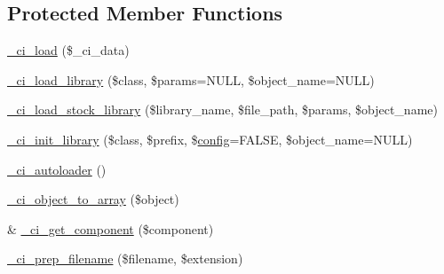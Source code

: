 \subsection*{Protected Member Functions}
\begin{DoxyCompactItemize}
\item 
\hyperlink{class_c_i___loader_ae3b5045c81f69c90afc7e918ff664d37}{\+\_\+ci\+\_\+load} (\$\+\_\+ci\+\_\+data)
\item 
\hyperlink{class_c_i___loader_a5ee20a37e1d55db949084f2f5563d2d2}{\+\_\+ci\+\_\+load\+\_\+library} (\$class, \$params=N\+U\+L\+L, \$object\+\_\+name=N\+U\+L\+L)
\item 
\hyperlink{class_c_i___loader_aa7c2bf48ad1c415720cd219e23f2d6e2}{\+\_\+ci\+\_\+load\+\_\+stock\+\_\+library} (\$library\+\_\+name, \$file\+\_\+path, \$params, \$object\+\_\+name)
\item 
\hyperlink{class_c_i___loader_a20ac1358ec26e9951959f26e2c5ca121}{\+\_\+ci\+\_\+init\+\_\+library} (\$class, \$prefix, \$\hyperlink{class_c_i___loader_af54799dcb5bf2f7346b5d2a7d824a471}{config}=F\+A\+L\+S\+E, \$object\+\_\+name=N\+U\+L\+L)
\item 
\hyperlink{class_c_i___loader_a93471c04ea0689dcf8faa5903d201efe}{\+\_\+ci\+\_\+autoloader} ()
\item 
\hyperlink{class_c_i___loader_ab000c31996cf4b8750f2c1d66aa8413b}{\+\_\+ci\+\_\+object\+\_\+to\+\_\+array} (\$object)
\item 
\& \hyperlink{class_c_i___loader_a189d7f497e55c20fb9f82b065c20e402}{\+\_\+ci\+\_\+get\+\_\+component} (\$component)
\item 
\hyperlink{class_c_i___loader_afbd52d4d271057334cb076106b50a327}{\+\_\+ci\+\_\+prep\+\_\+filename} (\$filename, \$extension)
\end{DoxyCompactItemize}
